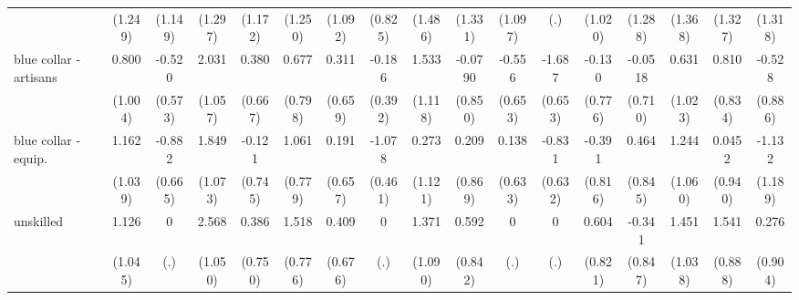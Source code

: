 {\begin{tabular}{l*{16}{c}}
                    &     (1.249)         &     (1.149)         &     (1.297)         &     (1.172)         &     (1.250)         &     (1.092)         &     (0.825)         &     (1.486)         &     (1.331)         &     (1.097)         &         (.)         &     (1.020)         &     (1.288)         &     (1.368)         &     (1.327)         &     (1.318)         \\
[1em]
blue collar - artisans&       0.800         &      -0.520         &       2.031         &       0.380         &       0.677         &       0.311         &      -0.186         &       1.533         &     -0.0790         &      -0.556         &      -1.687\sym{**} &      -0.130         &     -0.0518         &       0.631         &       0.810         &      -0.528         \\
                    &     (1.004)         &     (0.573)         &     (1.057)         &     (0.667)         &     (0.798)         &     (0.659)         &     (0.392)         &     (1.118)         &     (0.850)         &     (0.653)         &     (0.653)         &     (0.776)         &     (0.710)         &     (1.023)         &     (0.834)         &     (0.886)         \\
[1em]
blue collar - equip.&       1.162         &      -0.882         &       1.849         &      -0.121         &       1.061         &       0.191         &      -1.078\sym{*}  &       0.273         &       0.209         &       0.138         &      -0.831         &      -0.391         &       0.464         &       1.244         &      0.0452         &      -1.132         \\
                    &     (1.039)         &     (0.665)         &     (1.073)         &     (0.745)         &     (0.779)         &     (0.657)         &     (0.461)         &     (1.121)         &     (0.869)         &     (0.633)         &     (0.632)         &     (0.816)         &     (0.845)         &     (1.060)         &     (0.940)         &     (1.189)         \\
[1em]
unskilled           &       1.126         &           0         &       2.568\sym{*}  &       0.386         &       1.518         &       0.409         &           0         &       1.371         &       0.592         &           0         &           0         &       0.604         &      -0.341         &       1.451         &       1.541         &       0.276         \\
                    &     (1.045)         &         (.)         &     (1.050)         &     (0.750)         &     (0.776)         &     (0.676)         &         (.)         &     (1.090)         &     (0.842)         &         (.)         &         (.)         &     (0.821)         &     (0.847)         &     (1.038)         &     (0.888)         &     (0.904)         \\

\end{tabular}}
